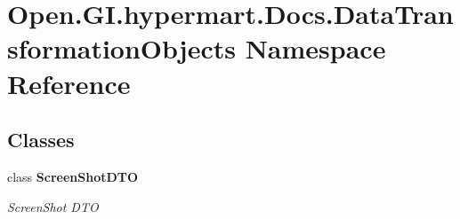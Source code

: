 \section{Open.\+G\+I.\+hypermart.\+Docs.\+Data\+Transformation\+Objects Namespace Reference}
\label{namespace_open_1_1_g_i_1_1hypermart_1_1_docs_1_1_data_transformation_objects}
\subsection*{Classes}
\begin{DoxyCompactItemize}
\item 
class \textbf{ Screen\+Shot\+D\+TO}
\begin{DoxyCompactList}\small\item\em Screen\+Shot D\+TO \end{DoxyCompactList}\end{DoxyCompactItemize}
